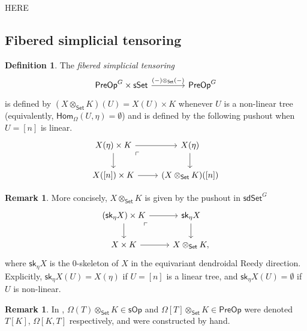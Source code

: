 \documentclass[a4paper,10pt
,draft
]{article}%
\numberwithin{equation}{section}
\numberwithin{figure}{section}
\theoremstyle{definition} %
\newtheorem{definition}[equation]{Definition}%
\newtheorem{remark}[equation]{Remark}%
\newcommand{\sOp}{\ensuremath{\mathsf{sOp}}}%
\newcommand{\1}{\ensuremath{\mathbbm 1}}%
\begin{document}
{\color{red} HERE}



















\subsection{Fibered simplicial tensoring}

\begin{definition}
	The \textit{fibered simplicial tensoring} 
\[
	\begin{tikzcd}[row sep = 0, column sep = 40pt]
	\mathsf{PreOp}^G \times \mathsf{sSet} \ar{r}{(-)\otimes_{\mathsf{Set}}(-)} &
	\mathsf{PreOp}^G
	\end{tikzcd}
\]
	is defined by $(X \otimes_{\mathsf{Set}} K)(U) = X(U) \times K$
	whenever $U$ is a non-linear tree (equivalently, 
	$\mathsf{Hom}_{\Omega}(U,\eta)=\emptyset$) and
	is defined by the following pushout when $U=[n]$ is linear.
\[
	\begin{tikzcd}
	X(\eta) \times K \ar{r} \ar{d} \arrow[dr, phantom, "\ulcorner", very near start]  &
	X(\eta) \ar{d}
	\\
	X([n]) \times K \ar{r} & 
	(X \otimes_{\mathsf{Set}} K)([n]) 
	\end{tikzcd}
\]
\end{definition}



\begin{remark}
	More concisely, $X \otimes_{\mathsf{Set}} K$ is given by the pushout in $\mathsf{sdSet}^G$
	\[
	\begin{tikzcd}
	\left(\mathsf{sk}_{\eta}X \right) \times K \ar{r} \ar{d} \arrow[dr, phantom, "\ulcorner", very near start]  &
	\mathsf{sk}_{\eta}X \ar{d}
	\\
	X \times K \ar{r} & 
	X \otimes_{\mathsf{Set}} K,
	\end{tikzcd}
	\]
	where $\mathsf{sk}_{\eta}X$ is the 0-skeleton of $X$ in the equivariant dendroidal Reedy direction.
	Explicitly, $\mathsf{sk}_{\eta}X(U) = X(\eta)$ if $U = [n]$ is a linear tree, 
	and $\mathsf{sk}_\eta X(U) = \emptyset$ if $U$ is non-linear.
\end{remark}



\begin{remark}
	In \cite[\S 71.]{CM13b}, $\Omega(T) \otimes_{\mathsf{Set}} K \in \sOp$ and $\Omega[T] \otimes_{\mathsf{Set}} K \in \mathsf{PreOp}$ were denoted $T[K]$, $\Omega[K,T]$ respectively, and were constructed by hand.
\end{remark}
\end{document}
